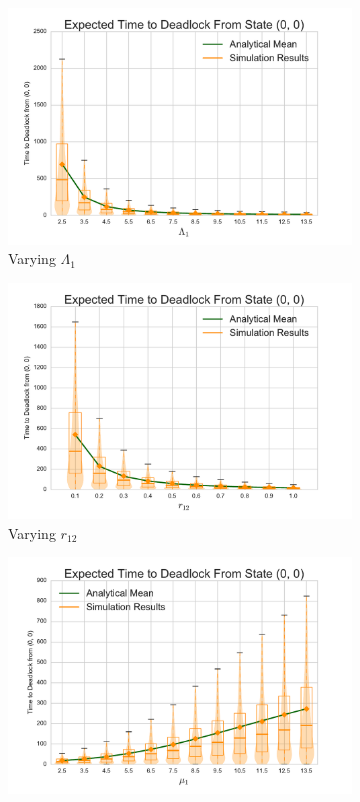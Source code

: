 \documentclass{article}
\begin{document}
\begin{figure}[H]
\begin{subfigure}[b]{0.5\textwidth}
  \includegraphics[width=\textwidth]{images/varyL1}
  \caption{Varying $\Lambda_1$}
  \label{fig:timestodeadlock2_L1}
\end{subfigure}
\begin{subfigure}[b]{0.5\textwidth}
  \includegraphics[width=\textwidth]{images/varyr12}
  \caption{Varying $r_{12}$}
  \label{fig:timestodeadlock2_r12}
\end{subfigure}
\begin{subfigure}[b]{0.5\textwidth}
  \includegraphics[width=\textwidth]{images/varymu1}

\end{subfigure}
\end{figure}
\end{document}
